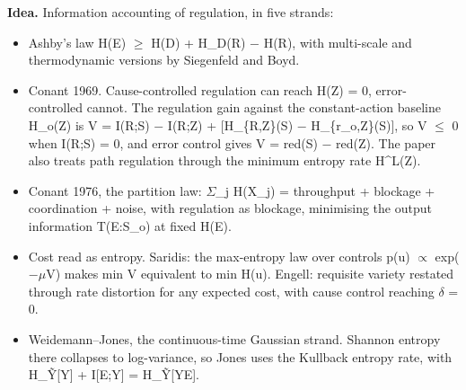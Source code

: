 \documentclass[10pt]{article}
\begin{document}
\textbf{Idea.} Information accounting of regulation, in five strands:
\begin{itemize}[nosep,leftmargin=1.2em]
\item Ashby's law H(E) \ensuremath{\geq} H(D) + H\_D(R) \ensuremath{-} H(R), with multi-scale and thermodynamic versions by Siegenfeld and Boyd.
\item Conant 1969. Cause-controlled regulation can reach H(Z) = 0, error-controlled cannot. The regulation gain against the constant-action baseline H\_o(Z) is V = I(R;S) \ensuremath{-} I(R;Z) + [H\_\{R,Z\}(S) \ensuremath{-} H\_\{r\_o,Z\}(S)], so V \ensuremath{\leq} 0 when I(R;S) = 0, and error control gives V = red(S) \ensuremath{-} red(Z). The paper also treats path regulation through the minimum entropy rate H\^{}L(Z).
\item Conant 1976, the partition law: \ensuremath{\Sigma}\_j H(X\_j) = throughput + blockage + coordination + noise, with regulation as blockage, minimising the output information T(E:S\_o) at fixed H(E).
\item Cost read as entropy. Saridis: the max-entropy law over controls p(u) \ensuremath{\propto} exp(\ensuremath{-}\ensuremath{\mu}V) makes min V equivalent to min H(u). Engell: requisite variety restated through rate distortion for any expected cost, with cause control reaching \ensuremath{\delta} = 0.
\item Weidemann--Jones, the continuous-time Gaussian strand. Shannon entropy there collapses to log-variance, so Jones uses the Kullback entropy rate, with H\_\~Y[Y] + I[E;Y] = H\_\~Y[Y\textbar{}E].
\end{itemize}
\end{document}
